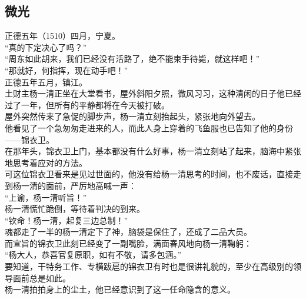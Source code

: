 \begin{multicols}{\theparacolNo}
\subsection{微光}
正德五年（1510）四月，宁夏。\\

“真的下定决心了吗？”\\

“周东如此胡来，我们已经没有活路了，绝不能束手待毙，就这样吧！”\\

“那就好，何指挥，现在动手吧！”\\

正德五年五月，镇江。\\

土财主杨一清正坐在大堂看书，屋外斜阳夕照，微风习习，这种清闲的日子他已经过了一年，但所有的平静都将在今天被打破。\\

屋外突然传来了急促的脚步声，杨一清立刻抬起头，紧张地向外望去。\\

他看见了一个急匆匆走进来的人，而此人身上穿着的飞鱼服也已告知了他的身份——锦衣卫。\\

在那年头，锦衣卫上门，基本都没有什么好事，杨一清立刻站了起来，脑海中紧张地思考着应对的方法。\\

可这位锦衣卫看来是见过世面的，他没有给杨一清思考的时间，也不废话，直接走到杨一清的面前，严厉地高喊一声：\\

“上谕，杨一清听旨！”\\

杨一清慌忙跪倒，等待着判决的到来。\\

“钦命！杨一清，起复三边总制！”\\

魂都走了一半的杨一清定下了神，脑袋是保住了，还成了二品大员。\\

而宣旨的锦衣卫此刻已经变了一副嘴脸，满面春风地向杨一清鞠躬：\\

“杨大人，恭喜官复原职，如有不敬，请多包涵。”\\

要知道，干特务工作、专横跋扈的锦衣卫有时也是很讲礼貌的，至少在高级别的领导面前总是如此。\\

杨一清拍拍身上的尘土，他已经意识到了这一任命隐含的意义。\\


\end{multicols}
